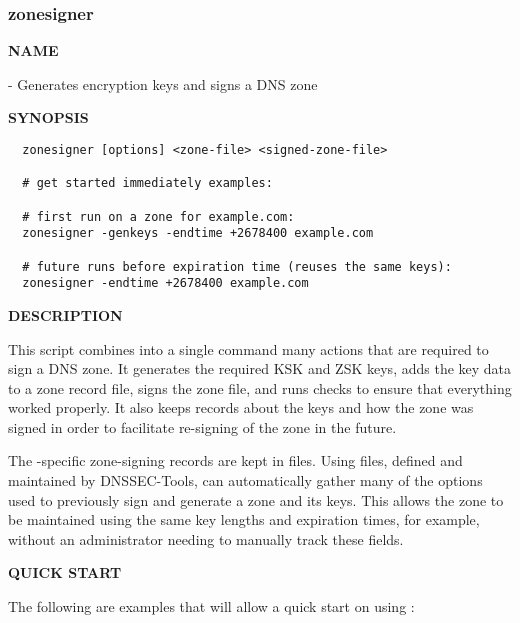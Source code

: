 \clearpage

\subsubsection{zonesigner}

{\bf NAME}

 - Generates encryption keys and signs a DNS zone

{\bf SYNOPSIS}

\begin{verbatim}
  zonesigner [options] <zone-file> <signed-zone-file>

  # get started immediately examples:

  # first run on a zone for example.com:
  zonesigner -genkeys -endtime +2678400 example.com

  # future runs before expiration time (reuses the same keys):
  zonesigner -endtime +2678400 example.com
\end{verbatim}

{\bf DESCRIPTION}

This script combines into a single command many actions that are required to
sign a DNS zone.  It generates the required KSK and ZSK keys, adds the key
data to a zone record file, signs the zone file, and runs checks to ensure
that everything worked properly.  It also keeps records about the keys and
how the zone was signed in order to facilitate re-signing of the zone in the
future.

The -specific zone-signing records are kept in 
files.  Using  files, defined and maintained by DNSSEC-Tools,
 can automatically gather many of the options used to
previously sign and generate a zone and its keys.  This allows the zone to be
maintained using the same key lengths and expiration times, for example,
without an administrator needing to manually track these fields.

{\bf QUICK START}

The following are examples that will allow a quick start on using
:

